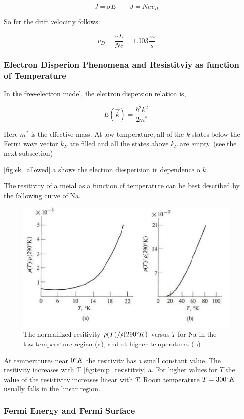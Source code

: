 $$J = \sigma E \qquad J = Nev_D$$

So for the drift velocitiy follows:

$$v_D =  \frac{\sigma E}{N e} = 1.003 \frac{m}{s}$$

\subsubsection*{Electron Disperion Phenomena and Resistitviy as function of Temperature}

In the free-electron model, the electron dispersion relation is,

$$E(\vec{k}) = \frac{\hbar^2k^2}{2m^*}$$

Here $m^*$ is the effective mass. At low temperature, all of
the $k$ states below the Fermi wave vector $k_F$ are filled 
and all the states above $k_F$ are empty.
(see the next subsection)

\autoref{fig:ek_allowed} a shows the electron diesperision in dependence o $k$.


The resitivity of a metal as a function of temperature can be best 
described by the following curve of Na.

\begin{figure}[H]
    \centering
    \includegraphics[width=0.6\linewidth]{Graphics/Chapter1/temp_resistitviy.png}
    \caption{The normailized resitivity $\rho(T)/\rho(290\degree K)$ versus $T$ 
    for Na in the low-temperature region (a), and at higher temperatures (b) 
    \cite[Elementary Solid State Physics p. 148]{elementary_SSP} }
    \label{fig:temp_resistitviy}
\end{figure}

At temperatures near $0 \degree K$ the resitivity has a small constant 
value. The resitivity increases with T \autoref{fig:temp_resistitviy} a.
For higher values for $T$ the value of the resistivity
increases linear with $T$. Room temperature $T=300\degree K$
usually falls in the linear region.

\subsubsection*{Fermi Energy and Fermi Surface}

